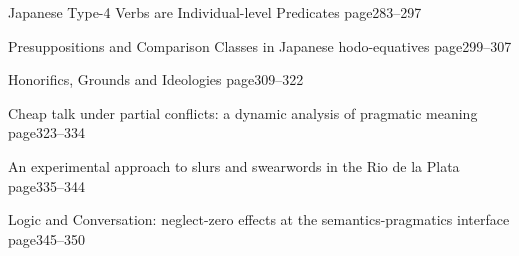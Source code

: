 \documentclass[12pt]{jarticle}
\begin{document}
     {Japanese Type-4 Verbs are Individual-level Predicates}
     {page283--297}
  
     {Presuppositions and Comparison Classes in Japanese hodo-equatives}
     {page299--307}




  
     {Honorifics, Grounds and Ideologies}
     {page309--322}
  
     {Cheap talk under partial conflicts: a dynamic analysis of pragmatic meaning}
     {page323--334}
  
     {An experimental approach to slurs and swearwords in the Rio de la Plata}
     {page335--344}




  
     {Logic and Conversation: neglect-zero effects at the semantics-pragmatics interface}
     {page345--350}







  
\end{document}
